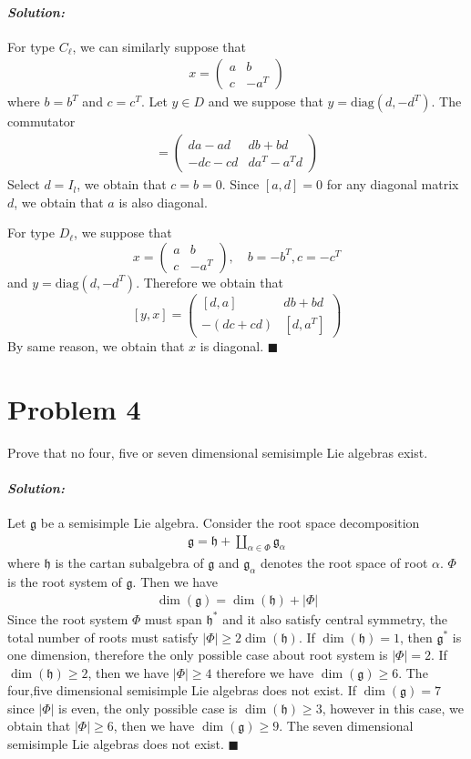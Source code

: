 \documentclass[12pt, a4paper]{article}
\newcommand{\g}{\mathfrak{g}}
\newcommand{\h}{\mathfrak{h}}
\newenvironment{solution}
  {\paragraph{\textit{Solution:}}\par\medskip}
  {\hfill$\blacksquare$\vspace{0.1cm}}
\begin{document}
\begin{solution}
  For type $C_\ell$, we can similarly suppose that 
  \begin{align*}
    x = \begin{pmatrix} a & b \\ c & -a^T \end{pmatrix}
  \end{align*}
  where $b=b^T$ and $c=c^T$. Let $y\in D$ and we suppose that $y=\text{diag}(d,-d^T)$. The commutator 
  \begin{align*}
    [y, x] = \begin{pmatrix} da - ad & db +bd \\ -dc - cd & da^T - a^T d \end{pmatrix}
  \end{align*}
  Select $d=I_l$, we obtain that $c=b=0$. Since $[a,d]=0$ for any diagonal matrix $d$, we obtain that $a$ is also diagonal.


  For type $D_\ell$, we suppose that 
  $$x = \begin{pmatrix} a & b \\ c & -a^T \end{pmatrix}, \quad b = -b^T, c = -c^T$$
  and $y=\text{diag}(d,-d^T)$. Therefore we obtain that 
  $$[y, x] = \begin{pmatrix} [d, a] & db + bd \\ -(dc + cd) & [d, a^T] \end{pmatrix}$$
  By same reason, we obtain that $x$ is diagonal.
\end{solution}



\section*{Problem 4}
Prove that no four, five or seven dimensional semisimple Lie algebras exist.

\begin{solution}
    Let $\g$ be a semisimple Lie algebra. Consider the root space decomposition 
    \begin{align*}
      \g = \h + \coprod_{\alpha\in \Phi} \g_\alpha
    \end{align*}
    where $\h$ is the cartan subalgebra of $\g$ and $\g_\alpha$ denotes the root space of root $\alpha$.
    $\Phi$ is the root system of $\g$.
    Then we have 
    \begin{align*}
      \dim(\g) = \dim(\h)+|\Phi|
    \end{align*}
    Since the root system $\Phi$ must span $\h^*$ and it also satisfy central symmetry,
    the total number of roots must satisfy $|\Phi| \ge 2\dim(\h)$.
    If $\dim(\h)=1$, then $\g^*$ is one dimension, therefore the only possible case about root system is $|\Phi|=2$.
    If $\dim(\h)\ge 2$, then we have $|\Phi|\ge 4$ therefore we have $\dim(\g)\ge 6$.
    The four,five dimensional semisimple Lie algebras does not exist.
    If $\dim(\g)=7$ since $|\Phi|$ is even, the only possible case is $\dim(\h)\ge 3$, however in this case, we obtain that $|\Phi|\ge 6$, then we have $\dim(\g)\ge 9$.
    The seven dimensional semisimple Lie algebras does not exist.
\end{solution}
\end{document}
